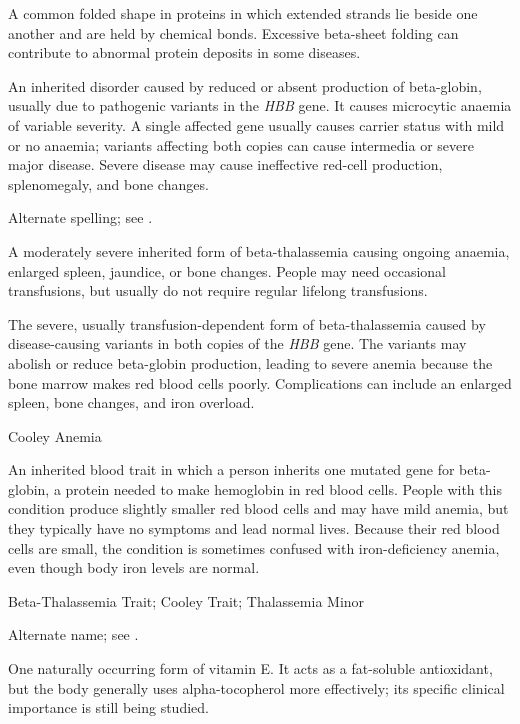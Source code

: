  A common folded shape in proteins in which extended strands lie beside one another and are held by chemical bonds. Excessive beta-sheet folding can contribute to abnormal protein deposits in some diseases.

 An inherited disorder caused by reduced or absent production of beta-globin, usually due to pathogenic variants in the \textit{HBB} gene.
It causes microcytic anaemia of variable severity. A single affected gene usually causes carrier status with mild or no anaemia; variants affecting both copies can cause intermedia or severe major disease.
Severe disease may cause ineffective red-cell production, splenomegaly, and bone changes.

 Alternate spelling; see .

 A moderately severe inherited form of beta-thalassemia causing ongoing anaemia, enlarged spleen, jaundice, or bone changes. People may need occasional transfusions, but usually do not require regular lifelong transfusions.

 The severe, usually transfusion-dependent form of beta-thalassemia caused by disease-causing variants in both copies of the \textit{HBB} gene. The variants may abolish or reduce beta-globin production, leading to severe anemia because the bone marrow makes red blood cells poorly. Complications can include an enlarged spleen, bone changes, and iron overload.

\synonyms
Cooley Anemia

 An inherited blood trait in which a person inherits one mutated gene for beta-globin, a protein needed to make hemoglobin in red blood cells. People with this condition produce slightly smaller red blood cells and may have mild anemia, but they typically have no symptoms and lead normal lives. Because their red blood cells are small, the condition is sometimes confused with iron-deficiency anemia, even though body iron levels are normal.

\synonyms
Beta-Thalassemia Trait; Cooley Trait; Thalassemia Minor

 Alternate name; see .

 One naturally occurring form of vitamin E. It acts as a fat-soluble antioxidant, but the body generally uses alpha-tocopherol more effectively; its specific clinical importance is still being studied.

